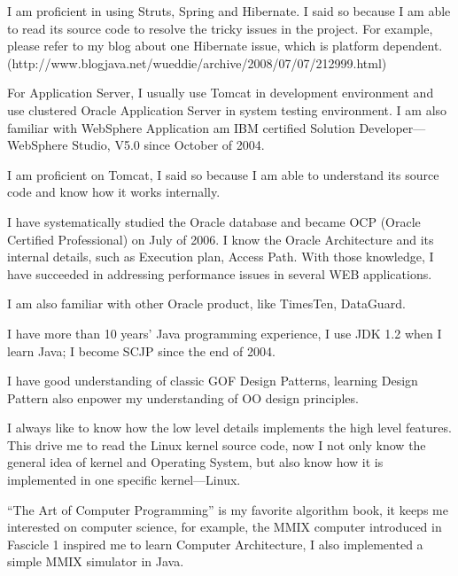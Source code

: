 I am proficient in using Struts, Spring and Hibernate. I said so because I am able to read its
source code to resolve the tricky issues in the project. For example, please refer to my blog about 
one Hibernate issue, which is platform dependent. (http://www.blogjava.net/wueddie/archive/2008/07/07/212999.html)

For Application Server, I usually use Tomcat in development environment and use clustered Oracle
Application Server in system testing environment. I am also familiar with WebSphere Application
am IBM certified Solution Developer---WebSphere Studio, V5.0 since October of 2004.

I am proficient on Tomcat, I said so because I am able to understand its source code and 
know how it works internally.

\par
I have systematically studied the Oracle database and became OCP 
(Oracle Certified Professional) on July of 2006. 
I know the Oracle Architecture and its 
internal details, such as Execution plan, Access Path.
With those knowledge, I have succeeded in addressing performance issues in
several WEB applications. 

I am also familiar with other Oracle product, like TimesTen, DataGuard.


\par
I have more than 10 years' Java programming experience, I use JDK 1.2 when I learn Java; I become SCJP since the 
end of 2004. 

I have good understanding of classic GOF Design Patterns, learning
Design Pattern also enpower my understanding of OO design principles.

\par
I always like to know how the low level details implements the high level features.
This drive me to read the Linux kernel source code, now I not only know the general 
idea of kernel and Operating System, but also know how it is implemented 
in one specific kernel---Linux.




\par
``The Art of Computer Programming'' is my favorite algorithm book, it keeps me 
interested on computer science, for example, the MMIX computer introduced in 
Fascicle 1 inspired me to learn Computer Architecture, I also implemented a 
simple MMIX simulator in Java. 



